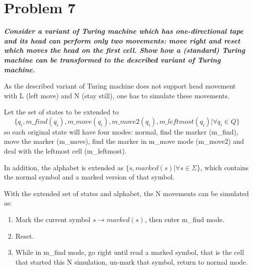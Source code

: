 \documentclass{article}
\begin{document}
\section{Problem 7}
\textbf{\textit{Consider a variant of Turing machine which has one-directional tape and its head can perform
only two movements: move right and reset which moves the head on the first cell. Show how a (standard)
Turing machine can be transformed to the described variant of Turing machine.}}

As the described variant of Turing machine does not support head movement with L (left move) and N (stay still), one has to simulate these movements.

Let the set of states to be extended to $$\{q_i, m\_find(q_i), m\_move(q_i), m\_move2(q_i), m\_leftmost(q_i)|\forall q_i \in Q\}$$
so each original state will have four modes: normal, find the marker (m\_find), move the marker (m\_move), find the marker in m\_move mode (m\_move2) and deal with the leftmost cell (m\_leftmost).

In addition, the alphabet is extended as $\{s, marked(s)|\forall s \in \Sigma\}$, which contains the normal symbol and a marked version of that symbol.

With the extended set of states and alphabet, the N movements can be simulated as:
\begin{enumerate}
    \item Mark the current symbol $s\to marked(s)$, then enter m\_find mode.
    \item Reset.
    \item While in m\_find mode, go right until read a marked symbol, that is the cell that started this N simulation, un-mark that symbol, return to normal mode.
\end{enumerate}
\end{document}
